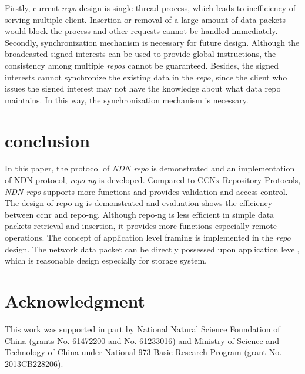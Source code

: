 \documentclass[conference]{IEEEtran}
\begin{document}
Firstly, current \emph{repo} design is single-thread process, which leads to inefficiency of serving multiple client. Insertion or removal of a large amount of data packets would block the process and other requests cannot be handled immediately. Secondly, synchronization mechanism is necessary for future design. Although the broadcasted signed interests can be used to provide global instructions, the consistency among multiple \emph{repos} cannot be guaranteed. Besides, the signed interests cannot synchronize the existing data in the \emph{repo}, since the client who issues the signed interest may not have the knowledge about what data repo maintains. In this way, the synchronization mechanism is necessary.

\section{conclusion} \label{section-conclusion}
In this paper, the protocol of \emph{NDN repo} is demonstrated and an implementation of NDN protocol, \emph{repo-ng} is developed. Compared to CCNx Repository Protocols, \emph{NDN repo} supports more functions and provides validation and access control. The design of repo-ng is demonstrated and evaluation shows the efficiency between ccnr and repo-ng. Although repo-ng is less efficient in simple data packets retrieval and insertion, it provides more functions especially remote operations. The concept of application level framing is implemented in the \emph{repo} design. The network data packet can be directly possessed upon application level, which is reasonable design especially for storage system.

\section*{Acknowledgment}
This work was supported in part by National Natural Science Foundation of China (grants No. 61472200 and No. 61233016) and Ministry of Science and Technology of China under National 973 Basic Research Program (grant No. 2013CB228206).



\end{document}
